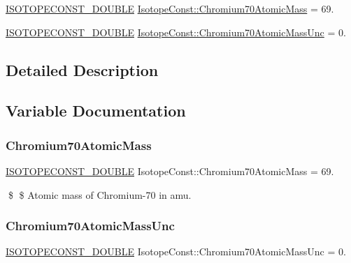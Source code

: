 \begin{DoxyCompactItemize}
\item 
\mbox{\hyperlink{group___isotope_const-_macros_ga8f45a7272ce02c0b4c65c44636ed719a}{I\+S\+O\+T\+O\+P\+E\+C\+O\+N\+S\+T\+\_\+\+D\+O\+U\+B\+LE}} \mbox{\hyperlink{group___isotope_const-_chromium-_cr70_ga6a62526a3f0ec5a2681947df8e8c93bd}{Isotope\+Const\+::\+Chromium70\+Atomic\+Mass}} = 69.
\item 
\mbox{\hyperlink{group___isotope_const-_macros_ga8f45a7272ce02c0b4c65c44636ed719a}{I\+S\+O\+T\+O\+P\+E\+C\+O\+N\+S\+T\+\_\+\+D\+O\+U\+B\+LE}} \mbox{\hyperlink{group___isotope_const-_chromium-_cr70_ga6f3249cff269b193f26d36e59d8f4daf}{Isotope\+Const\+::\+Chromium70\+Atomic\+Mass\+Unc}} = 0.
\end{DoxyCompactItemize}


\subsection{Detailed Description}


\subsection{Variable Documentation}
\mbox{\label{group___isotope_const-_chromium-_cr70_ga6a62526a3f0ec5a2681947df8e8c93bd}} 
\subsubsection{\texorpdfstring{Chromium70\+Atomic\+Mass}{Chromium70AtomicMass}}
{\footnotesize\ttfamily \mbox{\hyperlink{group___isotope_const-_macros_ga8f45a7272ce02c0b4c65c44636ed719a}{I\+S\+O\+T\+O\+P\+E\+C\+O\+N\+S\+T\+\_\+\+D\+O\+U\+B\+LE}} Isotope\+Const\+::\+Chromium70\+Atomic\+Mass = 69.}

\$ \$ Atomic mass of Chromium-\/70 in amu. \mbox{\label{group___isotope_const-_chromium-_cr70_ga6f3249cff269b193f26d36e59d8f4daf}} 
\subsubsection{\texorpdfstring{Chromium70\+Atomic\+Mass\+Unc}{Chromium70AtomicMassUnc}}
{\footnotesize\ttfamily \mbox{\hyperlink{group___isotope_const-_macros_ga8f45a7272ce02c0b4c65c44636ed719a}{I\+S\+O\+T\+O\+P\+E\+C\+O\+N\+S\+T\+\_\+\+D\+O\+U\+B\+LE}} Isotope\+Const\+::\+Chromium70\+Atomic\+Mass\+Unc = 0.}

